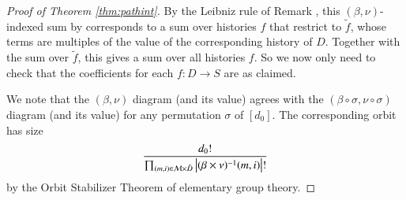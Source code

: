 \begin{proof}[Proof of Theorem \ref{thm:pathint}]
            By the Leibniz rule of Remark \label{rmk:leibniz}, this $(\beta,
            \nu)$-indexed sum by corresponds to a sum over histories $f$ that
            restrict to $\tilde f$, whose terms are multiples of the value of
            the corresponding history of $D$.  Together with the sum over
            $\tilde f$, this gives a sum over all histories $f$.  So we now
            only need to check that the coefficients for each $f:D\to S$ are as
            claimed.

            We note that the $(\beta, \nu)$ diagram (and its value) agrees with
            the $(\beta \circ \sigma, \nu \circ \sigma)$ diagram (and its
            value) for any permutation $\sigma$ of $[d_0]$.  The corresponding
            orbit has size
            \begin{align*}
                \frac{d_0!}{
                    \prod_{(m, i) \in \mathcal{M} \times \tilde D}
                        \left|(\beta \times \nu)^{-1}(m, i)\right|!
                }
            \end{align*}
            by the Orbit Stabilizer Theorem of elementary group theory.   


\end{proof}
